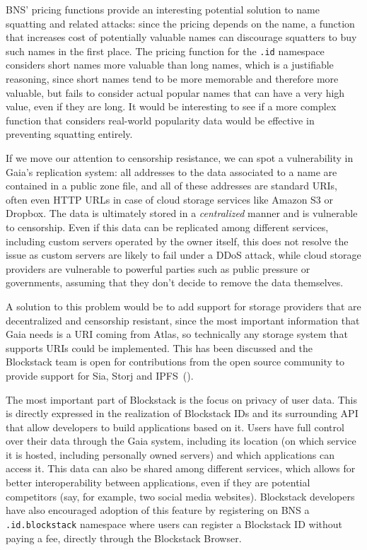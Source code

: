 \documentclass[mscthesis]{usiinfthesis}
\begin{document}
BNS' pricing functions provide an interesting potential solution to name squatting and related attacks: since the pricing depends on the name, a function that increases cost of potentially valuable names can discourage squatters to buy such names in the first place. The pricing function for the \texttt{.id} namespace considers short names more valuable than long names, which is a justifiable reasoning, since short names tend to be more memorable and therefore more valuable, but fails to consider actual popular names that can have a very high value, even if they are long. It would be interesting to see if a more complex function that considers real-world popularity data would be effective in preventing squatting entirely.

If we move our attention to censorship resistance, we can spot a vulnerability in Gaia's replication system: all addresses to the data associated to a name are contained in a public zone file, and all of these addresses are standard URIs, often even HTTP URLs in case of cloud storage services like Amazon S3 or Dropbox. The data is ultimately stored in a \emph{centralized} manner and is vulnerable to censorship. Even if this data can be replicated among different services, including custom servers operated by the owner itself, this does not resolve the issue as custom servers are likely to fail under a DDoS attack, while cloud storage providers are vulnerable to powerful parties such as public pressure or governments, assuming that they don't decide to remove the data themselves.

A solution to this problem would be to add support for storage providers that are decentralized and censorship resistant, since the most important information that Gaia needs is a URI coming from Atlas, so technically any storage system that supports URIs could be implemented. This has been discussed and the Blockstack team is open for contributions from the open source community to provide support for Sia, Storj and IPFS~(\cite{website:gaiaimprovements}).

The most important part of Blockstack is the focus on privacy of user data. This is directly expressed in the realization of Blockstack IDs and its surrounding API that allow developers to build applications based on it. Users have full control over their data through the Gaia system, including its location (on which service it is hosted, including personally owned servers) and which applications can access it. This data can also be shared among different services, which allows for better interoperability between applications, even if they are potential competitors (say, for example, two social media websites). Blockstack developers have also encouraged adoption of this feature by registering on BNS a \texttt{.id.blockstack} namespace where users can register a Blockstack ID without paying a fee, directly through the Blockstack Browser.
\end{document}
